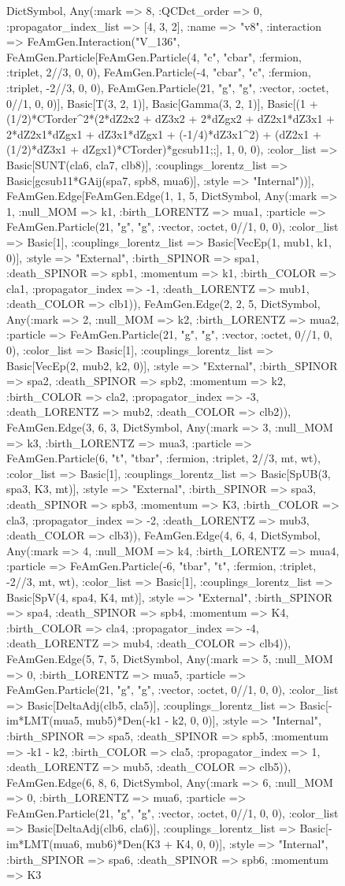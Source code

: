\documentclass{revtex4}
\begin{document}
\begin{figure}[!htb]
\begin{center}
{Dict{Symbol, Any}(:mark => 8, :QCDct_order => 0, :propagator_index_list => [4, 3, 2], :name => "v8", :interaction => FeAmGen.Interaction("V_136", FeAmGen.Particle[FeAmGen.Particle(4, "c", "cbar", :fermion, :triplet, 2//3, 0, 0), FeAmGen.Particle(-4, "cbar", "c", :fermion, :triplet, -2//3, 0, 0), FeAmGen.Particle(21, "g", "g", :vector, :octet, 0//1, 0, 0)], Basic[T(3, 2, 1)], Basic[Gamma(3, 2, 1)], Basic[(1 + (1/2)*CTorder^2*(2*dZ2x2 + dZ3x2 + 2*dZgx2 + dZ2x1*dZ3x1 + 2*dZ2x1*dZgx1 + dZ3x1*dZgx1 + (-1/4)*dZ3x1^2) + (dZ2x1 + (1/2)*dZ3x1 + dZgx1)*CTorder)*gcsub11;;], 1, 0, 0), :color_list => Basic[SUNT(cla6, cla7, clb8)], :couplings_lorentz_list => Basic[gcsub11*GAij(spa7, spb8, mua6)], :style => "Internal"))], FeAmGen.Edge[FeAmGen.Edge(1, 1, 5, Dict{Symbol, Any}(:mark => 1, :null_MOM => k1, :birth_LORENTZ => mua1, :particle => FeAmGen.Particle(21, "g", "g", :vector, :octet, 0//1, 0, 0), :color_list => Basic[1], :couplings_lorentz_list => Basic[VecEp(1, mub1, k1, 0)], :style => "External", :birth_SPINOR => spa1, :death_SPINOR => spb1, :momentum => k1, :birth_COLOR => cla1, :propagator_index => -1, :death_LORENTZ => mub1, :death_COLOR => clb1)), FeAmGen.Edge(2, 2, 5, Dict{Symbol, Any}(:mark => 2, :null_MOM => k2, :birth_LORENTZ => mua2, :particle => FeAmGen.Particle(21, "g", "g", :vector, :octet, 0//1, 0, 0), :color_list => Basic[1], :couplings_lorentz_list => Basic[VecEp(2, mub2, k2, 0)], :style => "External", :birth_SPINOR => spa2, :death_SPINOR => spb2, :momentum => k2, :birth_COLOR => cla2, :propagator_index => -3, :death_LORENTZ => mub2, :death_COLOR => clb2)), FeAmGen.Edge(3, 6, 3, Dict{Symbol, Any}(:mark => 3, :null_MOM => k3, :birth_LORENTZ => mua3, :particle => FeAmGen.Particle(6, "t", "tbar", :fermion, :triplet, 2//3, mt, wt), :color_list => Basic[1], :couplings_lorentz_list => Basic[SpUB(3, spa3, K3, mt)], :style => "External", :birth_SPINOR => spa3, :death_SPINOR => spb3, :momentum => K3, :birth_COLOR => cla3, :propagator_index => -2, :death_LORENTZ => mub3, :death_COLOR => clb3)), FeAmGen.Edge(4, 6, 4, Dict{Symbol, Any}(:mark => 4, :null_MOM => k4, :birth_LORENTZ => mua4, :particle => FeAmGen.Particle(-6, "tbar", "t", :fermion, :triplet, -2//3, mt, wt), :color_list => Basic[1], :couplings_lorentz_list => Basic[SpV(4, spa4, K4, mt)], :style => "External", :birth_SPINOR => spa4, :death_SPINOR => spb4, :momentum => K4, :birth_COLOR => cla4, :propagator_index => -4, :death_LORENTZ => mub4, :death_COLOR => clb4)), FeAmGen.Edge(5, 7, 5, Dict{Symbol, Any}(:mark => 5, :null_MOM => 0, :birth_LORENTZ => mua5, :particle => FeAmGen.Particle(21, "g", "g", :vector, :octet, 0//1, 0, 0), :color_list => Basic[DeltaAdj(clb5, cla5)], :couplings_lorentz_list => Basic[-im*LMT(mua5, mub5)*Den(-k1 - k2, 0, 0)], :style => "Internal", :birth_SPINOR => spa5, :death_SPINOR => spb5, :momentum => -k1 - k2, :birth_COLOR => cla5, :propagator_index => 1, :death_LORENTZ => mub5, :death_COLOR => clb5)), FeAmGen.Edge(6, 8, 6, Dict{Symbol, Any}(:mark => 6, :null_MOM => 0, :birth_LORENTZ => mua6, :particle => FeAmGen.Particle(21, "g", "g", :vector, :octet, 0//1, 0, 0), :color_list => Basic[DeltaAdj(clb6, cla6)], :couplings_lorentz_list => Basic[-im*LMT(mua6, mub6)*Den(K3 + K4, 0, 0)], :style => "Internal", :birth_SPINOR => spa6, :death_SPINOR => spb6, :momentum => K3 }
\end{center}
\end{figure}
\end{document}
